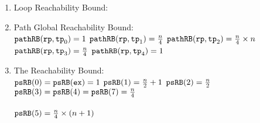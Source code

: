 \begin{enumerate}
    \item Loop Reachability Bound:
    \\
    \item Path Global Reachability Bound:
    \\
    $\mathtt{pathRB}(\mathtt{rp}, \mathtt{tp}_0) = 1$ \quad
    $\mathtt{pathRB}(\mathtt{rp}, \mathtt{tp}_1) = \frac{n}{4}$ \quad
    $\mathtt{pathRB}(\mathtt{rp}, \mathtt{tp}_2) = \frac{n}{4} \times n$ \\
    $\mathtt{pathRB}(\mathtt{rp}, \mathtt{tp}_3) = \frac{n}{4}$ \quad
    $\mathtt{pathRB}(\mathtt{rp}, \mathtt{tp}_4) = 1$
    \item The Reachability Bound:
    \\
    $\mathtt{psRB}(0) = \mathtt{psRB}(\mathtt{ex}) = 1$ \quad
    $\mathtt{psRB}(1) = \frac{n}{2} + 1$ \quad
    $\mathtt{psRB}(2) = \frac{n}{2} $ \\
    $\mathtt{psRB}(3) = \mathtt{psRB}(4) = \mathtt{psRB}(7) = \frac{n}{4} $ \\
     \\
    $\mathtt{psRB}(5) =  \frac{n}{4} \times (n + 1)$
  \end{enumerate}